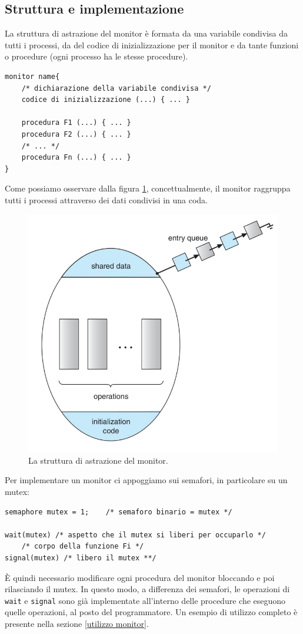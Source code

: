 \subsection{Struttura e implementazione}
La struttura di astrazione del monitor è formata da una variabile condivisa da tutti i processi, da del codice di inizializzazione per il monitor e da tante funzioni o procedure (ogni processo ha le stesse procedure).
\begin{lstlisting}[caption={Struttura del monitor}]
monitor name{
    /* dichiarazione della variabile condivisa */
    codice di inizializzazione (...) { ... }

    procedura F1 (...) { ... }
    procedura F2 (...) { ... }
    /* ... */ 
    procedura Fn (...) { ... }    
}
\end{lstlisting}
Come possiamo osservare dalla figura \ref{fig:monitor}, concettualmente, il monitor raggruppa tutti i processi attraverso dei dati condivisi in una coda.
\begin{figure}[!h]
    \centering
    \includegraphics[width=.55\textwidth]{../res/imgs/synchronization/monitor.png}
    \caption{La struttura di astrazione del monitor.}
    \label{fig:monitor}
\end{figure}

Per implementare un monitor ci appoggiamo sui semafori, in particolare su un mutex:
\begin{lstlisting}
semaphore mutex = 1;    /* semaforo binario = mutex */

wait(mutex) /* aspetto che il mutex si liberi per occuparlo */
    /* corpo della funzione Fi */
signal(mutex) /* libero il mutex **/
\end{lstlisting}
È quindi necessario modificare ogni procedura del monitor bloccando e poi rilasciando il mutex. In questo modo, a differenza dei semafori, le operazioni di \texttt{wait} e \texttt{signal} sono già implementate all'interno delle procedure che eseguono quelle operazioni, al posto del programmatore. Un esempio di utilizzo completo è presente nella sezione \ref{utilizzo monitor}.

